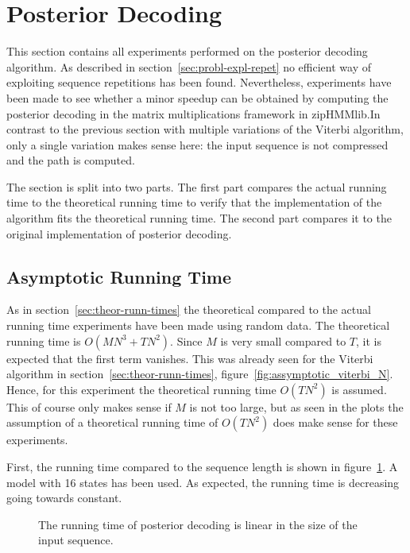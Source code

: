 \section{Posterior Decoding}

This section contains all experiments performed on the posterior decoding
algorithm. As described in section~\ref{sec:probl-expl-repet} no efficient way
of exploiting sequence repetitions has been found. Nevertheless, experiments
have been made to see whether a minor speedup can be obtained by computing the
posterior decoding in the matrix multiplications framework in zipHMMlib.\@ In
contrast to the previous section with multiple variations of the Viterbi
algorithm, only a single variation makes sense here: the input sequence is not
compressed and the path is computed.

The section is split into two parts. The first part compares the actual running
time to the theoretical running time to verify that the implementation of the
algorithm fits the theoretical running time. The second part compares it to the
original implementation of posterior decoding.

\subsection{Asymptotic Running Time}
\label{sec:asympt-runn-time}

As in section~\ref{sec:theor-runn-times} the theoretical compared to the actual
running time experiments have been made using random data. The theoretical
running time is $O(M N^3 + TN^2)$. Since $M$ is very small compared to $T$, it
is expected that the first term vanishes. This was already seen for the Viterbi
algorithm in section~\ref{sec:theor-runn-times},
figure~\ref{fig:assymptotic_viterbi_N}. Hence, for this experiment the
theoretical running time $O(TN^2)$ is assumed. This of course only makes sense
if $M$ is not too large, but as seen in the plots the assumption of a
theoretical running time of $O(TN^2)$ does make sense for these experiments.

First, the running time compared to the sequence length is shown in
figure~\ref{fig:posterior_T}. A model with 16 states has been used. As expected,
the running time is decreasing going towards constant.

\begin{figure}
  \centering
  
  \caption{The running time of posterior decoding is linear in the size of the
    input sequence.}
  \label{fig:posterior_T}
\end{figure}

